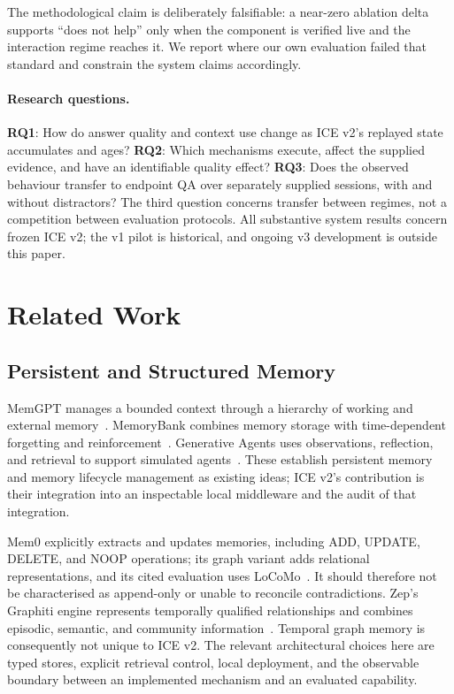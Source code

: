 \documentclass[11pt,a4paper]{article}
\begin{document}
The methodological claim is deliberately falsifiable: a near-zero ablation delta supports ``does not help'' only when the component is verified live and the interaction regime reaches it. We report where our own evaluation failed that standard and constrain the system claims accordingly.

\paragraph{Research questions.}
\textbf{RQ1}: How do answer quality and context use change as ICE v2's replayed state accumulates and ages?
\textbf{RQ2}: Which mechanisms execute, affect the supplied evidence, and have an identifiable quality effect?
\textbf{RQ3}: Does the observed behaviour transfer to endpoint QA over separately supplied sessions, with and without distractors?
The third question concerns transfer between regimes, not a competition between evaluation protocols. All substantive system results concern frozen ICE v2; the v1 pilot is historical, and ongoing v3 development is outside this paper.

\section{Related Work}
\label{sec:related-work}
\subsection{Persistent and Structured Memory}
\label{sec:related-memory}
MemGPT manages a bounded context through a hierarchy of working and external memory~\citep{packer2023memgpt}. MemoryBank combines memory storage with time-dependent forgetting and reinforcement~\citep{zhong2024memorybank}. Generative Agents uses observations, reflection, and retrieval to support simulated agents~\citep{park2023generative}. These establish persistent memory and memory lifecycle management as existing ideas; ICE v2's contribution is their integration into an inspectable local middleware and the audit of that integration.

Mem0 explicitly extracts and updates memories, including ADD, UPDATE, DELETE, and NOOP operations; its graph variant adds relational representations, and its cited evaluation uses LoCoMo~\citep{chhikara2025mem0}. It should therefore not be characterised as append-only or unable to reconcile contradictions. Zep's Graphiti engine represents temporally qualified relationships and combines episodic, semantic, and community information~\citep{rasmussen2025zep}. Temporal graph memory is consequently not unique to ICE v2. The relevant architectural choices here are typed stores, explicit retrieval control, local deployment, and the observable boundary between an implemented mechanism and an evaluated capability.
\end{document}

